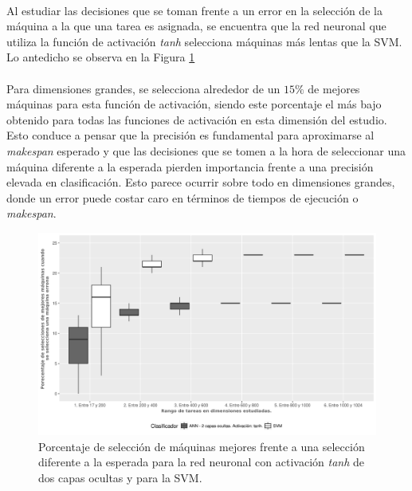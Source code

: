 \paragraph{} Al estudiar las decisiones que se toman frente a un error en la selección de la máquina a la que una tarea es asignada, se encuentra que la red neuronal que utiliza la función de activación \textit{tanh} selecciona máquinas más lentas que la SVM.
Lo antedicho se observa en la Figura \ref{fig:tanh_mejores} 

\paragraph{} Para dimensiones grandes, se selecciona alrededor de un $15\%$ de mejores máquinas para esta función de activación, siendo este porcentaje el más bajo obtenido para todas las funciones de activación en esta dimensión del estudio.
Esto conduce a pensar que la precisión es fundamental para aproximarse al \textit{makespan} esperado y que las decisiones que se tomen a la hora de seleccionar una máquina diferente a la esperada pierden importancia frente a una precisión elevada en clasificación.
Esto parece ocurrir sobre todo en dimensiones grandes, donde un error puede costar caro en términos de tiempos de ejecución o \textit{makespan}.

\begin{figure}[H]
  \centering
  \includegraphics[width=\columnwidth]{imagenes/tanh/4_porcentaje_maquinas_mejores_ann_2_capas_ocultas_tanh.png}
  \caption{Porcentaje de selección de máquinas mejores frente a una selección diferente a la esperada para la red neuronal con activación \textit{tanh} de dos capas ocultas y para la SVM.}
  \label{fig:tanh_mejores}
\end{figure}

